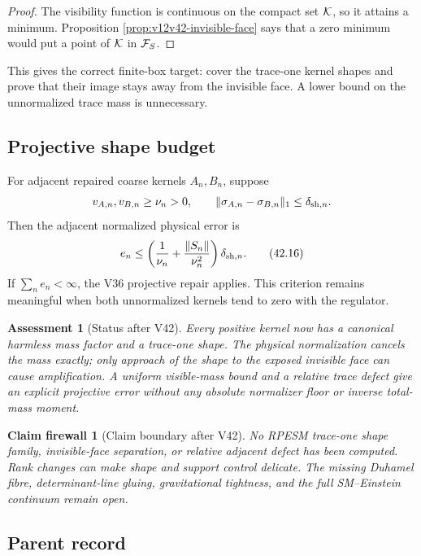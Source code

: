 \documentclass[11pt]{article}
\newtheorem{firewall}[theorem]{Claim firewall}
\newtheorem{assessment}[theorem]{Assessment}
\theoremstyle{remark}
\begin{document}
\begin{proof}
The visibility function is continuous on the compact set
\({\cal K}\), so it attains a minimum.  Proposition
\ref{prop:v12v42-invisible-face} says that a zero minimum would put a
point of \({\cal K}\) in \({\cal F}_S\).
\end{proof}

This gives the correct finite-box target: cover the trace-one kernel
shapes and prove that their image stays away from the invisible face.
A lower bound on the unnormalized trace mass is unnecessary.

\subsection{Projective shape budget}

For adjacent repaired coarse kernels \(A_n,B_n\), suppose
\[
 v_{A,n},v_{B,n}\geq\nu_n>0,\qquad
 \|\sigma_{A,n}-\sigma_{B,n}\|_1\leq\delta_{{\rm sh},n}.
\]
Then the adjacent normalized physical error is
\begin{equation}
 e_n
 \leq
 \left({1\over\nu_n}
       +{\|S_n\|\over\nu_n^2}\right)
 \delta_{{\rm sh},n}.                            \tag{42.16}
\end{equation}
If \(\sum_ne_n<\infty\), the V36 projective repair applies.  This
criterion remains meaningful when both unnormalized kernels tend to
zero with the regulator.

\begin{assessment}[Status after V42]
\label{ass:v12v42-status}
Every positive kernel now has a canonical harmless mass factor and
a trace-one shape.  The physical normalization cancels the mass
exactly; only approach of the shape to the exposed invisible face
can cause amplification.  A uniform visible-mass bound and a
relative trace defect give an explicit projective error without any
absolute normalizer floor or inverse total-mass moment.
\end{assessment}

\begin{firewall}[Claim boundary after V42]
\label{fire:v12v42-claim}
No RPESM trace-one shape family, invisible-face separation, or
relative adjacent defect has been computed.  Rank changes can make
shape and support control delicate.  The missing Duhamel fibre,
determinant-line gluing, gravitational tightness, and the full
SM--Einstein continuum remain open.
\end{firewall}

\subsection{Parent record}
\end{document}
